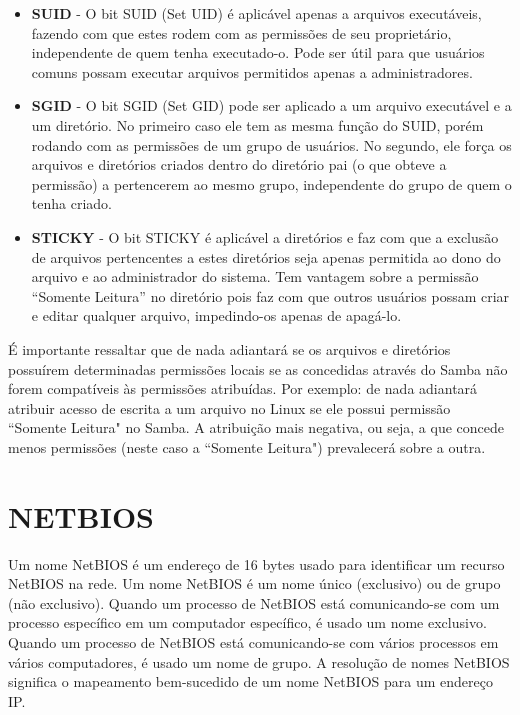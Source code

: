   \begin{itemize}
    \item \textbf{SUID} - O bit SUID (Set UID) é aplicável apenas a arquivos executáveis, fazendo com que estes rodem com as permissões de seu proprietário, independente de quem tenha executado-o. Pode ser útil para que usuários comuns possam executar arquivos permitidos apenas a administradores.

    \item \textbf{SGID} - O bit SGID (Set GID) pode ser aplicado a um arquivo executável e a um diretório. No primeiro caso ele tem as mesma função do SUID, porém rodando com as permissões de um grupo de usuários. No segundo, ele força os arquivos e diretórios criados dentro do diretório pai (o que obteve a permissão) a pertencerem ao mesmo grupo, independente do grupo de quem o tenha criado.

    \item \textbf{STICKY} - O bit STICKY é aplicável a diretórios e faz com que a exclusão de arquivos pertencentes a estes diretórios seja apenas permitida ao dono do arquivo e ao administrador do sistema. Tem vantagem sobre a permissão “Somente Leitura” no diretório pois faz com que outros usuários possam criar e editar qualquer arquivo, impedindo-os apenas de apagá-lo.
  \end{itemize}

É importante ressaltar que de nada adiantará se os arquivos e diretórios possuírem determinadas permissões locais se as concedidas através do Samba não forem compatíveis às permissões atribuídas. Por exemplo: de nada adiantará atribuir acesso de escrita a um arquivo no Linux se ele possui permissão ``Somente Leitura" no Samba. A atribuição mais negativa, ou seja, a que concede menos permissões (neste caso a ``Somente Leitura") prevalecerá sobre a outra.

\section{NETBIOS}

Um nome NetBIOS é um endereço de 16 bytes usado para identificar um recurso NetBIOS na rede. Um nome NetBIOS é um nome único (exclusivo) ou de grupo (não exclusivo). Quando um processo de NetBIOS está comunicando-se com um processo específico em um computador específico, é usado um nome exclusivo. Quando um processo de NetBIOS está comunicando-se com vários processos em vários computadores, é usado um nome de grupo. A resolução de nomes NetBIOS significa o mapeamento bem-sucedido de um nome NetBIOS para um endereço IP.\cite{NETBIOS}

